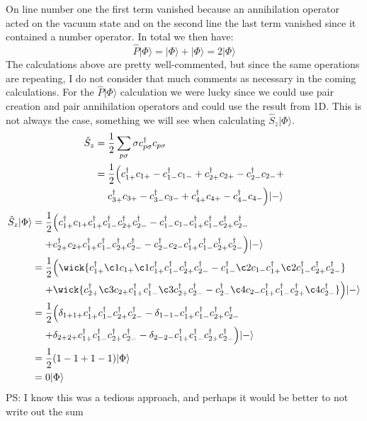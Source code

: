 \documentclass[norsk,a4paper,12pt]{article}
\begin{document}
On line number one the first term vanished because an annihilation operator acted on the vacuum state and on the second line the last term vanished since it contained a number operator. In total we then have:
\begin{equation}
\hat{P}|\Phi\rangle=|\Phi\rangle+|\Phi\rangle=2|\Phi\rangle
\end{equation}
The calculations above are pretty well-commented, but since the same operations are repeating, I do not consider that much comments as necessary in the coming calculations. For the $\hat{P}|\Phi\rangle$ calculation we were lucky since we could use pair creation and pair annihilation operators and could use the result from 1D. This is not always the case, something we will see when calculating $\hat{S}_z|\Phi\rangle$.
\begin{align}
\hat{S}_z&=\frac{1}{2}\sum_{p\sigma}\sigma c_{p\sigma}^{\dagger}c_{p\sigma}\\
&=\frac{1}{2}\Big(c_{1+}^{\dagger}c_{1+}-c_{1-}^{\dagger}c_{1-}+c_{2+}^{\dagger}c_{2+}-c_{2-}^{\dagger}c_{2-}+\notag\\
&\mathrel{\phantom{=}}c_{3+}^{\dagger}c_{3+}-c_{3-}^{\dagger}c_{3-}+c_{4+}^{\dagger}c_{4+}-c_{4-}^{\dagger}c_{4-}\Big)|-\rangle
\end{align}
\begin{align}
\hat{S}_z|\Phi\rangle
&=\frac{1}{2}\Big(c_{1+}^{\dagger}c_{1+}c_{1+}^{\dagger}c_{1-}^{\dagger}c_{2+}^{\dagger}c_{2-}^{\dagger}-c_{1-}^{\dagger}c_{1-}c_{1+}^{\dagger}c_{1-}^{\dagger}c_{2+}^{\dagger}c_{2-}^{\dagger}\notag\\
&\mathrel{\phantom{=}}+c_{2+}^{\dagger}c_{2+}c_{1+}^{\dagger}c_{1-}^{\dagger}c_{2+}^{\dagger}c_{2-}^{\dagger}-c_{2-}^{\dagger}c_{2-}c_{1+}^{\dagger}c_{1-}^{\dagger}c_{2+}^{\dagger}c_{2-}^{\dagger}\Big)|-\rangle\\
&=\frac{1}{2}\Big(\wick{c_{1+}^{\dagger}\c1 c_{1+}\c1 c_{1+}^{\dagger}c_{1-}^{\dagger}c_{2+}^{\dagger}c_{2-}^{\dagger}-c_{1-}^{\dagger}\c2 c_{1-}c_{1+}^{\dagger}\c2 c_{1-}^{\dagger}c_{2+}^{\dagger}c_{2-}^{\dagger}}\notag\\
&\mathrel{\phantom{=}}+\wick{c_{2+}^{\dagger}\c3 c_{2+}c_{1+}^{\dagger}c_{1-}^{\dagger}\c3 c_{2+}^{\dagger}c_{2-}^{\dagger}-c_{2-}^{\dagger}\c4 c_{2-}c_{1+}^{\dagger}c_{1-}^{\dagger}c_{2+}^{\dagger}\c4 c_{2-}^{\dagger}}\Big)|-\rangle\\
&=\frac{1}{2}\Big(\delta_{1+1+}c_{1+}^{\dagger}c_{1-}^{\dagger}c_{2+}^{\dagger}c_{2-}^{\dagger}-\delta_{1-1-}c_{1+}^{\dagger}c_{1-}^{\dagger}c_{2+}^{\dagger}c_{2-}^{\dagger}\notag\\\
&\mathrel{\phantom{=}}+\delta_{2+2+}c_{1+}^{\dagger}c_{1-}^{\dagger}c_{2+}^{\dagger}c_{2-}^{\dagger}-\delta_{2-2-}c_{1+}^{\dagger}c_{1-}^{\dagger}c_{2+}^{\dagger}c_{2-}^{\dagger}\Big)|-\rangle\\
&=\frac{1}{2}(1-1+1-1)|\Phi\rangle\\
&=0|\Phi\rangle
\end{align}
PS: I know this was a tedious approach, and perhaps it would be better to not write out the sum
\end{document}
